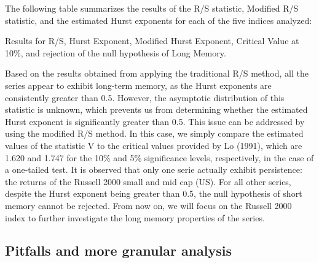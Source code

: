 \documentclass[11pt]{extarticle}
\begin{document}
The following table summarizes the results of the R/S statistic, Modified R/S statistic, and the estimated Hurst exponents for each of the five indices analyzed: \\

\begin{table}[h!]
    \centering
    \caption{Results for R/S, Hurst Exponent, Modified Hurst Exponent, Critical Value at 10\%, and rejection of the null
    hypothesis of Long Memory.}
    \label{tab:hurst_results}
\end{table}

\FloatBarrier


Based on the results obtained from applying the traditional R/S method, all the series appear to exhibit long-term memory,
as the Hurst exponents are consistently greater than 0.5. However, the asymptotic distribution of this statistic is unknown,
which prevents us from determining whether the estimated Hurst exponent is significantly greater than 0.5. This issue can be
addressed by using the modified R/S method. In this case, we simply compare the estimated values of the statistic V to the
critical values provided by Lo (1991), which are 1.620 and 1.747 for the 10\% and 5\% significance levels, respectively,
in the case of a one-tailed test. It is observed that only one serie actually exhibit persistence: the returns of the Russell 2000 small and mid cap (US).
For all other series, despite the Hurst exponent being greater than 0.5, the null hypothesis
of short memory cannot be rejected.
From now on, we will focus on the Russell 2000 index to further investigate the long memory properties of the series.


\subsection{Pitfalls and more granular analysis}
\end{document}
